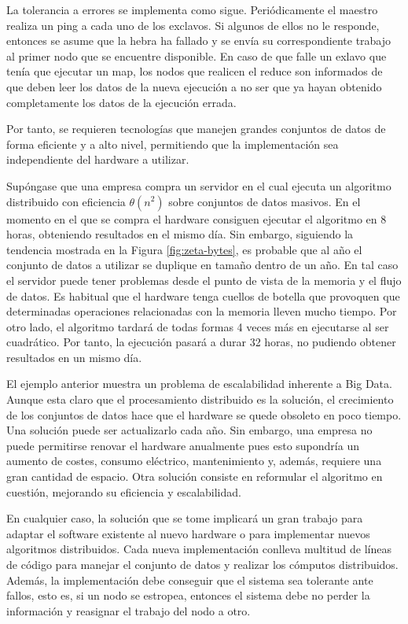 \documentclass[10pt]{article}
\begin{document}
		La tolerancia a errores se implementa como sigue. Periódicamente el maestro realiza un ping a cada uno de los exclavos. Si algunos de ellos no le responde, entonces se asume que la hebra ha fallado y se envía su correspondiente trabajo al primer nodo que se encuentre disponible. En caso de que falle un exlavo que tenía que ejecutar un map, los nodos que realicen el reduce son informados de que deben leer los datos de la nueva ejecución a no ser que ya hayan obtenido completamente los datos de la ejecución errada.

		Por tanto, se requieren tecnologías que manejen grandes conjuntos de datos de forma eficiente y a alto nivel, permitiendo que la implementación sea independiente del hardware a utilizar.

		Supóngase que una empresa compra un servidor en el cual ejecuta un algoritmo distribuido con eficiencia $\theta(n^2)$ sobre conjuntos de datos masivos. En el momento en el que se compra el hardware consiguen ejecutar el algoritmo en 8 horas, obteniendo resultados en el mismo día. Sin embargo, siguiendo la tendencia mostrada en la Figura \ref{fig:zeta-bytes}, es probable que al año el conjunto de datos a utilizar se duplique en tamaño dentro de un año. En tal caso el servidor puede tener problemas desde el punto de vista de la memoria y el flujo de datos. Es habitual que el hardware tenga cuellos de botella que provoquen que determinadas operaciones relacionadas con la memoria lleven mucho tiempo.  Por otro lado, el algoritmo tardará de todas formas 4 veces más en ejecutarse al ser cuadrático. Por tanto, la ejecución pasará a durar 32 horas, no pudiendo obtener resultados en un mismo día. 
		
		El ejemplo anterior muestra un problema de escalabilidad inherente a Big Data. Aunque esta claro que el procesamiento distribuido es la solución, el crecimiento de los conjuntos de datos hace que el hardware se quede obsoleto en poco tiempo. Una solución puede ser actualizarlo cada año. Sin embargo, una empresa no puede permitirse renovar el hardware anualmente pues esto supondría un aumento de costes, consumo eléctrico, mantenimiento y, además, requiere una gran cantidad de espacio. Otra solución consiste en reformular el algoritmo en cuestión, mejorando su eficiencia y escalabilidad.
		
		En cualquier caso, la solución que se tome implicará un gran trabajo para adaptar el software existente al nuevo hardware o para implementar nuevos algoritmos distribuidos. Cada nueva implementación conlleva multitud de líneas de código para manejar el conjunto de datos y realizar los cómputos distribuidos. Además, la implementación debe conseguir que el sistema sea tolerante ante fallos, esto es, si un nodo se estropea, entonces el sistema debe no perder la información y reasignar el trabajo del nodo a otro.
\end{document}
